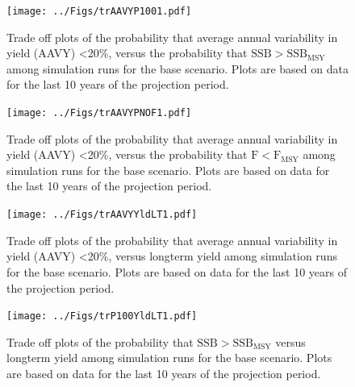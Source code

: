 \documentclass[12pt,english]{article}
\begin{document}
\begin{figure}[!ht]
\begin{center}
\texttt{[image: ../Figs/trAAVYP1001.pdf]}
\end{center}
\begin{flushleft}
\caption{Trade off plots of the probability that average annual variability in yield (AAVY) <20\%, versus  the probability that $\mathrm{SSB > SSB_{MSY}}$ among simulation runs for the base scenario. Plots are based on data for the last 10 years of the projection period.}
\label{fig:trAAVYP1001}
\end{flushleft}
\end{figure}
\clearpage\begin{figure}[!ht]
\begin{center}
\texttt{[image: ../Figs/trAAVYPNOF1.pdf]}
\end{center}
\begin{flushleft}
\caption{Trade off plots of the probability that average annual variability in yield (AAVY) <20\%, versus  the probability that $\mathrm{F < F_{MSY}}$ among simulation runs for the base scenario. Plots are based on data for the last 10 years of the projection period.}
\label{fig:trAAVYPNOF1}
\end{flushleft}
\end{figure}
\clearpage\begin{figure}[!ht]
\begin{center}
\texttt{[image: ../Figs/trAAVYYldLT1.pdf]}
\end{center}
\begin{flushleft}
\caption{Trade off plots of the probability that average annual variability in yield (AAVY) <20\%, versus  longterm yield among simulation runs for the base scenario. Plots are based on data for the last 10 years of the projection period.}
\label{fig:trAAVYYldLT1}
\end{flushleft}
\end{figure}
\clearpage\begin{figure}[!ht]
\begin{center}
\texttt{[image: ../Figs/trP100YldLT1.pdf]}
\end{center}
\begin{flushleft}
\caption{Trade off plots of the probability that $\mathrm{SSB > SSB_{MSY}}$ versus  longterm yield among simulation runs for the base scenario. Plots are based on data for the last 10 years of the projection period.}
\label{fig:trP100YldLT1}
\end{flushleft}
\end{figure}
\end{document}
